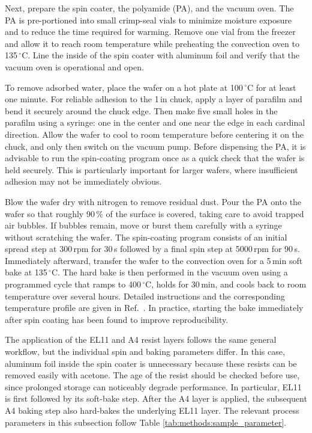        Next, prepare the spin coater, the polyamide (PA), and the vacuum oven. The PA is pre-portioned into small crimp-seal vials to minimize moisture exposure and to reduce the time required for warming. Remove one vial from the freezer and allow it to reach room temperature while preheating the convection oven to 135\,$^\circ$C. Line the inside of the spin coater with aluminum foil and verify that the vacuum oven is operational and open.

        To remove adsorbed water, place the wafer on a hot plate at 100\,$^\circ$C for at least one minute. For reliable adhesion to the 1\,in chuck, apply a layer of parafilm and bend it securely around the chuck edge. Then make five small holes in the parafilm using a syringe: one in the center and one near the edge in each cardinal direction. Allow the wafer to cool to room temperature before centering it on the chuck, and only then switch on the vacuum pump. Before dispensing the PA, it is advisable to run the spin-coating program once as a quick check that the wafer is held securely. This is particularly important for larger wafers, where insufficient adhesion may not be immediately obvious.
        
        Blow the wafer dry with nitrogen to remove residual dust. Pour the PA onto the wafer so that roughly 90\,\% of the surface is covered, taking care to avoid trapped air bubbles. If bubbles remain, move or burst them carefully with a syringe without scratching the wafer. The spin-coating program consists of an initial spread step at 300\,rpm for 30\,s followed by a final spin step at 5000\,rpm for 90\,s. Immediately afterward, transfer the wafer to the convection oven for a 5\,min soft bake at 135\,$^\circ$C. The hard bake is then performed in the vacuum oven using a programmed cycle that ramps to 400\,$^\circ$C, holds for 30\,min, and cools back to room temperature over several hours. Detailed instructions and the corresponding temperature profile are given in Ref.~\cite{raif_fabrication_2023}. In practice, starting the bake immediately after spin coating has been found to improve reproducibility.
        
        The application of the EL11 and A4 resist layers follows the same general workflow, but the individual spin and baking parameters differ. In this case, aluminum foil inside the spin coater is unnecessary because these resists can be removed easily with acetone. The age of the resist should be checked before use, since prolonged storage can noticeably degrade performance. In particular, EL11 is first followed by its soft-bake step. After the A4 layer is applied, the subsequent A4 baking step also hard-bakes the underlying EL11 layer. The relevant process parameters in this subsection follow Table \ref{tab:methods:sample_parameter}.

